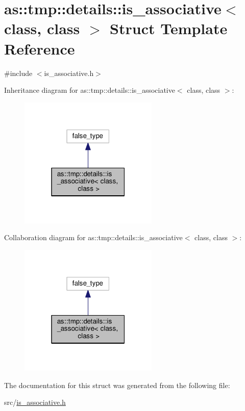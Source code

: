\hypertarget{structas_1_1tmp_1_1details_1_1is__associative}{}\section{as\+:\+:tmp\+:\+:details\+:\+:is\+\_\+associative$<$ class, class $>$ Struct Template Reference}
\label{structas_1_1tmp_1_1details_1_1is__associative}


{\ttfamily \#include $<$is\+\_\+associative.\+h$>$}



Inheritance diagram for as\+:\+:tmp\+:\+:details\+:\+:is\+\_\+associative$<$ class, class $>$\+:
\nopagebreak
\begin{figure}[H]
\begin{center}
\leavevmode
\includegraphics[width=187pt]{structas_1_1tmp_1_1details_1_1is__associative__inherit__graph}
\end{center}
\end{figure}


Collaboration diagram for as\+:\+:tmp\+:\+:details\+:\+:is\+\_\+associative$<$ class, class $>$\+:
\nopagebreak
\begin{figure}[H]
\begin{center}
\leavevmode
\includegraphics[width=187pt]{structas_1_1tmp_1_1details_1_1is__associative__coll__graph}
\end{center}
\end{figure}


The documentation for this struct was generated from the following file\+:\begin{DoxyCompactItemize}
\item 
src/\hyperlink{is__associative_8h}{is\+\_\+associative.\+h}\end{DoxyCompactItemize}
